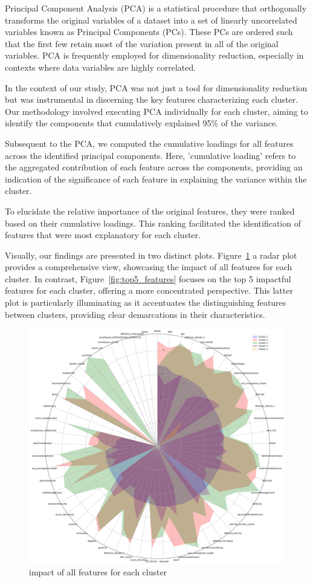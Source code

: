 \documentclass[12pt]{article}
\begin{document}
Principal Component Analysis (PCA) is a statistical procedure that orthogonally transforms the original variables of a dataset into a set of linearly uncorrelated variables known as Principal Components (PCs). These PCs are ordered such that the first few retain most of the variation present in all of the original variables. PCA is frequently employed for dimensionality reduction, especially in contexts where data variables are highly correlated.

In the context of our study, PCA was not just a tool for dimensionality reduction but was instrumental in discerning the key features characterizing each cluster. Our methodology involved executing PCA individually for each cluster, aiming to identify the components that cumulatively explained 95\% of the variance.

Subsequent to the PCA, we computed the cumulative loadings for all features across the identified principal components. Here, 'cumulative loading' refers to the aggregated contribution of each feature across the components, providing an indication of the significance of each feature in explaining the variance within the cluster.

To elucidate the relative importance of the original features, they were ranked based on their cumulative loadings. This ranking facilitated the identification of features that were most explanatory for each cluster.

Visually, our findings are presented in two distinct plots. 
Figure~\ref{fig:all_features} a radar plot provides a comprehensive view, showcasing the impact of all features for each cluster. 
In contrast, Figure~\ref{fig:top5_features} focuses on the top 5 impactful features for each cluster, offering a more concentrated perspective. This latter plot is particularly illuminating as it accentuates the distinguishing features between clusters, providing clear demarcations in their characteristics.

\begin{figure}[h]
  \centering
  \includegraphics[width=0.7\linewidth]{images/all_feature}
  \caption{impact of all features for each cluster}
  \label{fig:all_features}
  \end{figure}
\end{document}
